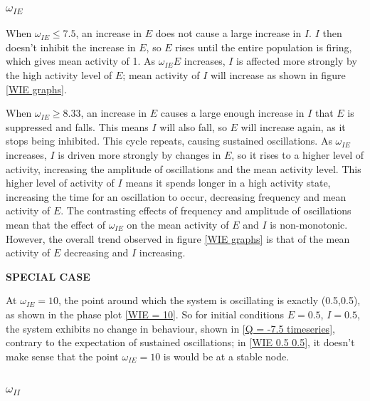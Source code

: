 \documentclass[10pt]{article}
\begin{document}
\begin{flushleft}
\subsubsection{$\omega_{IE}$}

\begin{flushleft}
When $\omega_{IE} \leq 7.5$, an increase in $E$ does not cause a large increase in $I$. $I$ then doesn't inhibit the increase in $E$, so $E$ rises until the entire population is firing, which gives mean activity of 1. As $\omega_{IE}E$ increases, $I$ is affected more strongly by the high activity level of $E$; mean activity of $I$ will increase as shown in figure \ref{WIE graphs}.
\newline

When $\omega_{IE} \geq 8.33$, an increase in $E$ causes a large enough increase in $I$ that $E$ is suppressed and falls. This means $I$ will also fall, so $E$ will increase again, as it stops being inhibited. This cycle repeats, causing sustained oscillations. As $\omega_{IE}$ increases, $I$ is driven more strongly by changes in $E$, so it rises to a higher level of activity, increasing the amplitude of oscillations and the mean activity level. This higher level of activity of $I$ means it spends longer in a high activity state, increasing the time for an oscillation to occur, decreasing frequency and mean activity of $E$. The contrasting effects of frequency and amplitude of oscillations mean that the effect of $\omega_{IE}$ on the mean activity of $E$ and $I$ is non-monotonic. However, the overall trend observed in figure \ref{WIE graphs} is that of the mean activity of $E$ decreasing and $I$ increasing.
\newline 

\end{flushleft}


\textbf{SPECIAL CASE}

At $\omega_{IE}=10$, the point around which the system is oscillating is exactly (0.5,0.5), as shown in the phase plot \ref{WIE = 10}. So for initial conditions $E = 0.5$, $I=0.5$, the system exhibits no change in behaviour, shown in \ref{Q = -7.5 timeseries}, contrary to the expectation of sustained oscillations; in \ref{WIE 0.5 0.5}, it doesn't make sense that the point $\omega_{IE}=10$ is would be at a stable node.

\subsubsection{$\omega_{II}$}


\end{flushleft}
\end{document}

